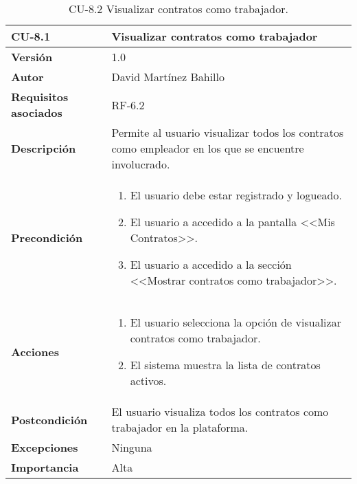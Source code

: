 \begin{table}[p]
	\centering
	\begin{tabularx}{\linewidth}{ p{} p{} }
		\toprule
		\textbf{CU-8.1}  & \textbf{Visualizar contratos como trabajador}\\
		\midrule
		\textbf{Versión}              & 1.0    \\
		\textbf{Autor}                & David Martínez Bahillo \\
		\textbf{Requisitos asociados} & RF-6.2 \\
		\textbf{Descripción}          & Permite al usuario visualizar todos los contratos como empleador en los que se encuentre involucrado. \\
		\textbf{Precondición}         &  
		\begin{enumerate}
			\def\labelenumi{\arabic{enumi}.}
			\tightlist
			\item El usuario debe estar registrado y logueado.
			\item El usuario a accedido a la pantalla <<Mis Contratos>>.
			\item El usuario a accedido a la sección <<Mostrar contratos como trabajador>>.
		\end{enumerate}\\
		\textbf{Acciones}             &
		\begin{enumerate}
			\def\labelenumi{\arabic{enumi}.}
			\tightlist
			\item El usuario selecciona la opción de visualizar contratos como trabajador.
			\item El sistema muestra la lista de contratos activos.
		\end{enumerate}\\
		\textbf{Postcondición}        & El usuario visualiza todos los contratos como trabajador en la plataforma. \\
		\textbf{Excepciones}          & Ninguna \\
		\textbf{Importancia}          & Alta \\
		\bottomrule
	\end{tabularx}
	\caption{CU-8.2 Visualizar contratos como trabajador.}
\end{table}


